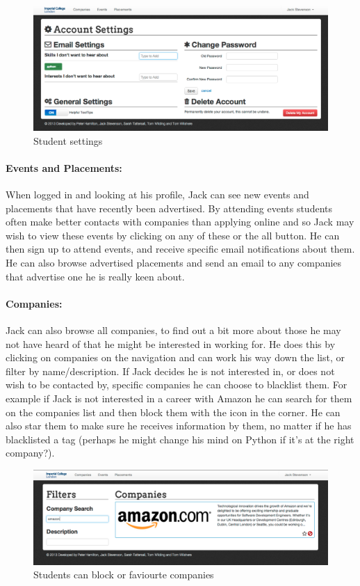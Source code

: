     \begin{figure}[H]\centering
    \includegraphics[scale=0.3]{images/user_experiences/student/account_settings}
    \caption{Student settings}
    \end{figure}

  \paragraph{Events and Placements:}
    When logged in and looking at his profile, Jack can see new events and placements that have recently been advertised. By attending events students often make better contacts with companies than applying online and so Jack may wish to view these events by clicking on any of these or the all button. He can then sign up to attend events, and receive specific email notifications about them.
    He can also browse advertised placements and send an email to any companies that advertise one he is really keen about.

  \paragraph{Companies:}
    Jack can also browse all companies, to find out a bit more about those he may not have heard of that he might be interested in working for. He does this by clicking on companies on the navigation and can work his way down the list, or filter by name/description.
    If Jack decides he is not interested in, or does not wish to be contacted by, specific companies he can choose to blacklist them. For example if Jack is not interested in a career with Amazon he can search for them on the companies list and then block them with the icon in the corner. He can also star them to make sure he receives information by them, no matter if he has blacklisted a tag (perhaps he might change his mind on Python if it's at the right company?).

    \begin{figure}[H]\centering
    \includegraphics[scale=0.3]{images/user_experiences/student/block_amazon}
    \caption{Students can block or faviourte companies}
    \end{figure}

